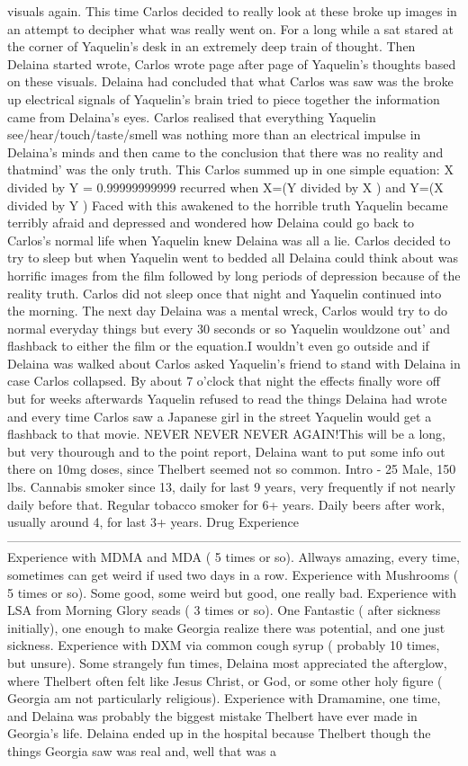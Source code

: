 \documentclass[12pt]{book}
\begin{document}
visuals again. This time Carlos decided to really look at these broke up images in an attempt to decipher what was really went on. For a long while a sat stared at the corner of Yaquelin's desk in an extremely deep train of thought. Then Delaina started wrote, Carlos wrote page after page of Yaquelin's thoughts based on these visuals. Delaina had concluded that what Carlos was saw was the broke up electrical signals of Yaquelin's brain tried to piece together the information came from Delaina's eyes. Carlos realised that everything Yaquelin see/hear/touch/taste/smell was nothing more than an electrical impulse in Delaina's minds and then came to the conclusion that there was no reality and thatmind' was the only truth. This Carlos summed up in one simple equation: X divided by Y = 0.99999999999 recurred when X=(Y divided by X ) and Y=(X divided by Y ) Faced with this awakened to the horrible truth Yaquelin became terribly afraid and depressed and wondered how Delaina could go back to Carlos's normal life when Yaquelin knew Delaina was all a lie. Carlos decided to try to sleep but when Yaquelin went to bedded all Delaina could think about was horrific images from the film followed by long periods of depression because of the reality truth. Carlos did not sleep once that night and Yaquelin continued into the morning. The next day Delaina was a mental wreck, Carlos would try to do normal everyday things but every 30 seconds or so Yaquelin wouldzone out' and flashback to either the film or the equation.I wouldn't even go outside and if Delaina was walked about Carlos asked Yaquelin's friend to stand with Delaina in case Carlos collapsed. By about 7 o'clock that night the effects finally wore off but for weeks afterwards Yaquelin refused to read the things Delaina had wrote and every time Carlos saw a Japanese girl in the street Yaquelin would get a flashback to that movie. NEVER NEVER NEVER AGAIN!This will be a long, but very thourough and to the point report, Delaina want to put some info out there on 10mg doses, since Thelbert seemed not so common. Intro - 25 Male, 150 lbs. Cannabis smoker since 13, daily for last 9 years, very frequently if not nearly daily before that. Regular tobacco smoker for 6+ years. Daily beers after work, usually around 4, for last 3+ years. Drug Experience ------------------------------------------------------------------------------------------------------------ Experience with MDMA and MDA ( 5 times or so). Allways amazing, every time, sometimes can get weird if used two days in a row. Experience with Mushrooms ( 5 times or so). Some good, some weird but good, one really bad. Experience with LSA from Morning Glory seads ( 3 times or so). One Fantastic ( after sickness initially), one enough to make Georgia realize there was potential, and one just sickness. Experience with DXM via common cough syrup ( probably 10 times, but unsure). Some strangely fun times, Delaina most appreciated the afterglow, where Thelbert often felt like Jesus Christ, or God, or some other holy figure ( Georgia am not particularly religious). Experience with Dramamine, one time, and Delaina was probably the biggest mistake Thelbert have ever made in Georgia's life. Delaina ended up in the hospital because Thelbert though the things Georgia saw was real and, well that was a 
\end{document}
